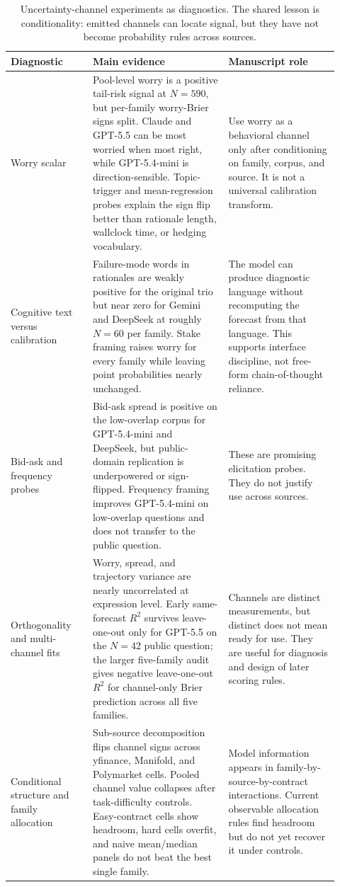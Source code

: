\documentclass[11pt]{article}
\begin{document}
\begin{table}[htbp]
\centering
\small
\begin{tabular}{L{0.23\linewidth} L{0.38\linewidth} L{0.31\linewidth}}
\toprule
Diagnostic & Main evidence & Manuscript role \\
\midrule
Worry scalar & Pool-level worry is a positive tail-risk signal at $N{=}590$, but per-family worry-Brier signs split. Claude and GPT-5.5 can be most worried when most right, while GPT-5.4-mini is direction-sensible. Topic-trigger and mean-regression probes explain the sign flip better than rationale length, wallclock time, or hedging vocabulary. & Use worry as a behavioral channel only after conditioning on family, corpus, and source. It is not a universal calibration transform. \\
Cognitive text versus calibration & Failure-mode words in rationales are weakly positive for the original trio but near zero for Gemini and DeepSeek at roughly $N{=}60$ per family. Stake framing raises worry for every family while leaving point probabilities nearly unchanged. & The model can produce diagnostic language without recomputing the forecast from that language. This supports interface discipline, not free-form chain-of-thought reliance. \\
Bid-ask and frequency probes & Bid-ask spread is positive on the low-overlap corpus for GPT-5.4-mini and DeepSeek, but public-domain replication is underpowered or sign-flipped. Frequency framing improves GPT-5.4-mini on low-overlap questions and does not transfer to the public question. & These are promising elicitation probes. They do not justify use across sources. \\
Orthogonality and multi-channel fits & Worry, spread, and trajectory variance are nearly uncorrelated at expression level. Early same-forecast $R^2$ survives leave-one-out only for GPT-5.5 on the $N{=}42$ public question; the larger five-family audit gives negative leave-one-out $R^2$ for channel-only Brier prediction across all five families. & Channels are distinct measurements, but distinct does not mean ready for use. They are useful for diagnosis and design of later scoring rules. \\
Conditional structure and family allocation & Sub-source decomposition flips channel signs across yfinance, Manifold, and Polymarket cells. Pooled channel value collapses after task-difficulty controls. Easy-contract cells show headroom, hard cells overfit, and naive mean/median panels do not beat the best single family. & Model information appears in family-by-source-by-contract interactions. Current observable allocation rules find headroom but do not yet recover it under controls. \\
\bottomrule
\end{tabular}
\caption{Uncertainty-channel experiments as diagnostics. The shared lesson is conditionality: emitted channels can locate signal, but they have not become probability rules across sources.}
\label{tab:elicitation-diagnostics}
\end{table}
\end{document}

